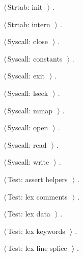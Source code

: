 \documentclass[11pt,a4paper,twoside,openright,DIV=15]{scrbook}
\theoremstyle{definition}
\theoremstyle{plain}
\theoremstyle{remark}
\begin{document}
{\begin{list}{}{\setlength{\itemsep}{-\parsep}\setlength{\itemindent}{-\leftmargin}}
\item $\langle\,$Strtab: init\nobreak\ {\footnotesize {}}$\,\rangle$ {\footnotesize {\NWtxtRefIn} .}
\item $\langle\,$Strtab: intern\nobreak\ {\footnotesize {}}$\,\rangle$ {\footnotesize {\NWtxtRefIn} .}
\item $\langle\,$Syscall: close\nobreak\ {\footnotesize {}}$\,\rangle$ {\footnotesize {\NWtxtRefIn} .}
\item $\langle\,$Syscall: constants\nobreak\ {\footnotesize {}}$\,\rangle$ {\footnotesize {\NWtxtRefIn} .
}
\item $\langle\,$Syscall: exit\nobreak\ {\footnotesize {}}$\,\rangle$ {\footnotesize {\NWtxtRefIn} .}
\item $\langle\,$Syscall: lseek\nobreak\ {\footnotesize {}}$\,\rangle$ {\footnotesize {\NWtxtRefIn} .}
\item $\langle\,$Syscall: mmap\nobreak\ {\footnotesize {}}$\,\rangle$ {\footnotesize {\NWtxtRefIn} .}
\item $\langle\,$Syscall: open\nobreak\ {\footnotesize {}}$\,\rangle$ {\footnotesize {\NWtxtRefIn} .}
\item $\langle\,$Syscall: read\nobreak\ {\footnotesize {}}$\,\rangle$ {\footnotesize {\NWtxtRefIn} .}
\item $\langle\,$Syscall: write\nobreak\ {\footnotesize {}}$\,\rangle$ {\footnotesize {\NWtxtRefIn} .}
\item $\langle\,$Test: assert helpers\nobreak\ {\footnotesize {}}$\,\rangle$ {\footnotesize {\NWtxtRefIn} .}
\item $\langle\,$Test: lex comments\nobreak\ {\footnotesize {}}$\,\rangle$ {\footnotesize {\NWtxtRefIn} .}
\item $\langle\,$Test: lex data\nobreak\ {\footnotesize {}}$\,\rangle$ {\footnotesize {\NWtxtRefIn} .}
\item $\langle\,$Test: lex keywords\nobreak\ {\footnotesize {}}$\,\rangle$ {\footnotesize {\NWtxtRefIn} .}
\item $\langle\,$Test: lex line splice\nobreak\ {\footnotesize {}}$\,\rangle$ {\footnotesize {\NWtxtRefIn} .}

\end{list}}
\end{document}

